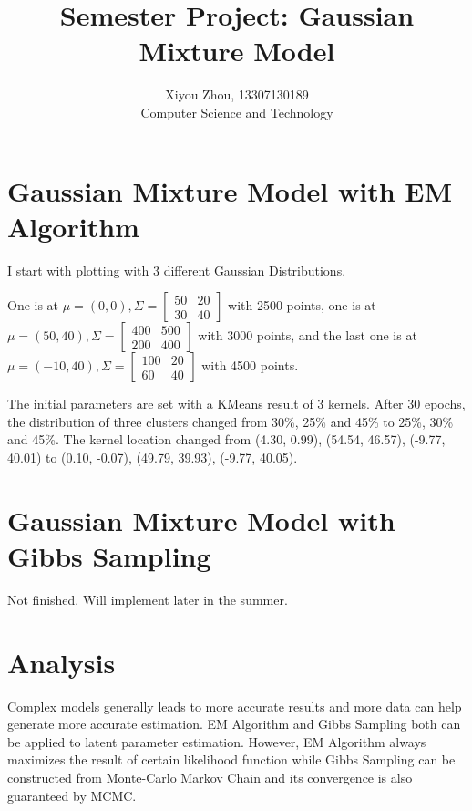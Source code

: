 \documentclass[11pt, oneside]{article}
\begin{document}
\title{Semester Project: Gaussian Mixture Model}
\author{Xiyou Zhou, 13307130189 \\ Computer Science and Technology}
\maketitle

\section{Gaussian Mixture Model with EM Algorithm}

I start with plotting with 3 different Gaussian Distributions.

One is at $\mu = (0, 0), \Sigma = \begin{bmatrix} 
50 & 20 \\
30 & 40 
\end{bmatrix}$ with 2500 points, one is at $\mu = (50, 40), \Sigma = \begin{bmatrix} 
400 & 500 \\
200 & 400 
\end{bmatrix}$ with 3000 points, and the last one is at $\mu = (-10, 40), \Sigma = \begin{bmatrix} 
100 & 20 \\
60 & 40 
\end{bmatrix}$ with 4500 points.

The initial parameters are set with a KMeans result of 3 kernels. After 30 epochs, the distribution of three clusters changed from 30\%, 25\% and 45\% to 25\%, 30\% and 45\%. The kernel location changed from (4.30, 0.99), (54.54, 46.57), (-9.77, 40.01) to (0.10, -0.07), (49.79, 39.93), (-9.77, 40.05).

\section{Gaussian Mixture Model with Gibbs Sampling}
Not finished. Will implement later in the summer.

\section{Analysis}

Complex models generally leads to more accurate results and more data can help generate more accurate estimation. EM Algorithm and Gibbs Sampling both can be applied to latent parameter estimation. However, EM Algorithm always maximizes the result of certain likelihood function while Gibbs Sampling can be constructed from Monte-Carlo Markov Chain and its convergence is also guaranteed by MCMC.
\end{document}
